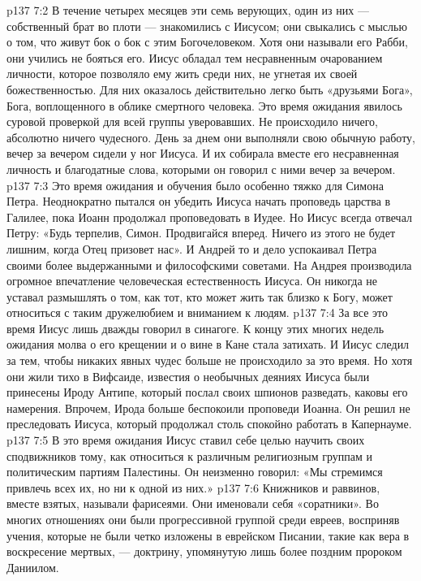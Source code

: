 \vs p137 7:2 В течение четырех месяцев эти семь верующих, один из них --- собственный брат во плоти --- знакомились с Иисусом; они свыкались с мыслью о том, что живут бок о бок с этим Богочеловеком. Хотя они называли его Рабби, они учились не бояться его. Иисус обладал тем несравненным очарованием личности, которое позволяло ему жить среди них, не угнетая их своей божественностью. Для них оказалось действительно легко быть «друзьями Бога», Бога, воплощенного в облике смертного человека. Это время ожидания явилось суровой проверкой для всей группы уверовавших. Не происходило ничего, абсолютно ничего чудесного. День за днем они выполняли свою обычную работу, вечер за вечером сидели у ног Иисуса. И их собирала вместе его несравненная личность и благодатные слова, которыми он говорил с ними вечер за вечером.
\vs p137 7:3 Это время ожидания и обучения было особенно тяжко для Симона Петра. Неоднократно пытался он убедить Иисуса начать проповедь царства в Галилее, пока Иоанн продолжал проповедовать в Иудее. Но Иисус всегда отвечал Петру: «Будь терпелив, Симон. Продвигайся вперед. Ничего из этого не будет лишним, когда Отец призовет нас». И Андрей то и дело успокаивал Петра своими более выдержанными и философскими советами. На Андрея производила огромное впечатление человеческая естественность Иисуса. Он никогда не уставал размышлять о том, как тот, кто может жить так близко к Богу, может относиться с таким дружелюбием и вниманием к людям.
\vs p137 7:4 За все это время Иисус лишь дважды говорил в синагоге. К концу этих многих недель ожидания молва о его крещении и о вине в Кане стала затихать. И Иисус следил за тем, чтобы никаких явных чудес больше не происходило за это время. Но хотя они жили тихо в Вифсаиде, известия о необычных деяниях Иисуса были принесены Ироду Антипе, который послал своих шпионов разведать, каковы его намерения. Впрочем, Ирода больше беспокоили проповеди Иоанна. Он решил не преследовать Иисуса, который продолжал столь спокойно работать в Капернауме.
\vs p137 7:5 В это время ожидания Иисус ставил себе целью научить своих сподвижников тому, как относиться к различным религиозным группам и политическим партиям Палестины. Он неизменно говорил: «Мы стремимся привлечь всех их, но  ни к одной из них.»
\vs p137 7:6 \pc Книжников и раввинов, вместе взятых, называли фарисеями. Они именовали себя «соратники». Во многих отношениях они были прогрессивной группой среди евреев, восприняв учения, которые не были четко изложены в еврейском Писании, такие как вера в воскресение мертвых, --- доктрину, упомянутую лишь более поздним пророком Даниилом.
